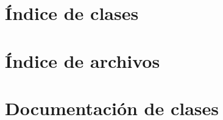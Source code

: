 \documentclass[twoside]{book}
\newcommand{\+}{\discretionary{\mbox{\scriptsize$\hookleftarrow$}}{}{}}
\begin{document}
\chapter{Índice de clases}

\chapter{Índice de archivos}

\chapter{Documentación de clases}

















\end{document}
